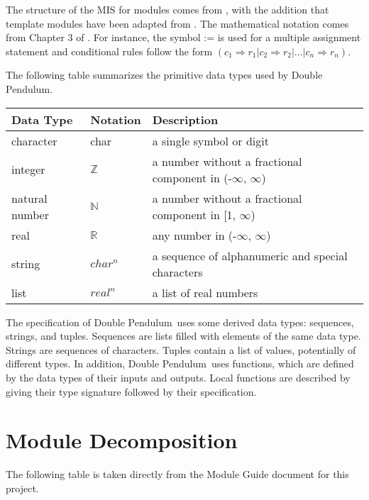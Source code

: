 \documentclass[12pt, titlepage]{article}
\newcommand{\progname}{Double Pendulum}
\begin{document}
The structure of the MIS for modules comes from \citet{HoffmanAndStrooper1995},
with the addition that template modules have been adapted from
\cite{GhezziEtAl2003}.  The mathematical notation comes from Chapter 3 of
\citet{HoffmanAndStrooper1995}.  For instance, the symbol := is used for a
multiple assignment statement and conditional rules follow the form $(c_1
\Rightarrow r_1 | c_2 \Rightarrow r_2 | ... | c_n \Rightarrow r_n )$.

The following table summarizes the primitive data types used by \progname. 

\begin{center}
\renewcommand{\arraystretch}{1.2}
\noindent 
\begin{tabular}{l l p{7.5cm}} 
\toprule 
\textbf{Data Type} & \textbf{Notation} & \textbf{Description}\\ 
\midrule
character & char & a single symbol or digit\\
integer & $\mathbb{Z}$ & a number without a fractional component in (-$\infty$, $\infty$) \\
natural number & $\mathbb{N}$ & a number without a fractional component in [1, $\infty$) \\
real & $\mathbb{R}$ & any number in (-$\infty$, $\infty$)\\
string & $char^n$ & a sequence of alphanumeric and special characters\\
list & $real^n$ & a list of real numbers\\
\bottomrule
\end{tabular} 
\end{center}

\noindent
The specification of \progname \ uses some derived data types: sequences, strings, and
tuples. Sequences are lists filled with elements of the same data type. Strings
are sequences of characters. Tuples contain a list of values, potentially of
different types. In addition, \progname \ uses functions, which
are defined by the data types of their inputs and outputs. Local functions are
described by giving their type signature followed by their specification.

\section{Module Decomposition}

The following table is taken directly from the Module Guide document for this project.
\end{document}
